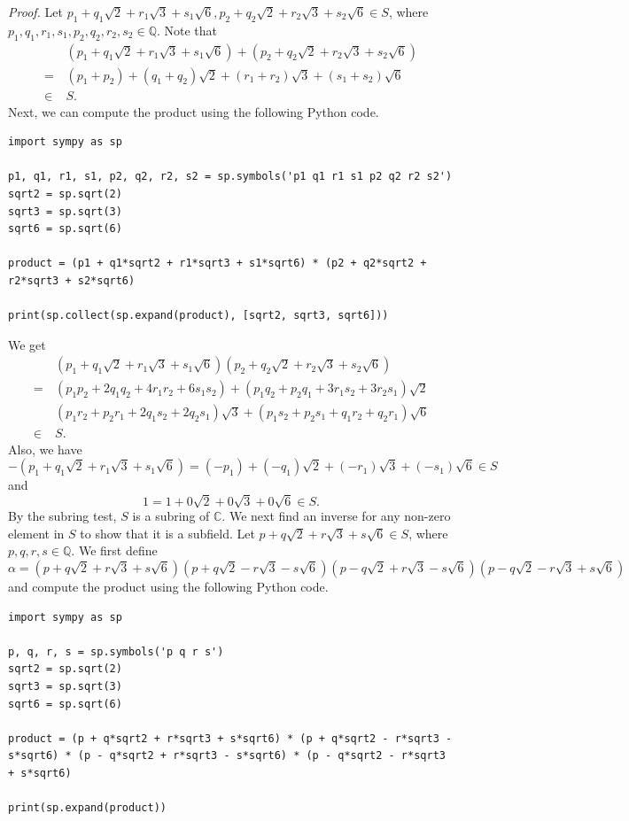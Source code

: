 \documentclass[a4paper, 12pt]{article}
\newcommand{\C}{\mathbb{C}}
\newcommand{\Q}{\mathbb{Q}}
\newcommand{\pf}{\noindent\textit{Proof. }}
\begin{document}
\pf Let $p_1+q_1\sqrt{2}+r_1\sqrt{3}+s_1\sqrt{6},p_2+q_2\sqrt{2}+r_2\sqrt{3}+s_2\sqrt{6} \in S$, where $p_1,q_1,r_1,s_1,p_2,q_2,r_2,s_2 \in \Q$. Note that
\begin{align*}
    & \, (p_1+q_1\sqrt{2}+r_1\sqrt{3}+s_1\sqrt{6}) + (p_2+q_2\sqrt{2}+r_2\sqrt{3}+s_2\sqrt{6}) \\
    =& \, (p_1+p_2)+(q_1+q_2)\sqrt{2}+(r_1+r_2)\sqrt{3}+(s_1+s_2)\sqrt{6} \\
    \in& \, S.
\end{align*}
Next, we can compute the product using the following Python code.
\begin{verbatim}
import sympy as sp

p1, q1, r1, s1, p2, q2, r2, s2 = sp.symbols('p1 q1 r1 s1 p2 q2 r2 s2')
sqrt2 = sp.sqrt(2)
sqrt3 = sp.sqrt(3)
sqrt6 = sp.sqrt(6)

product = (p1 + q1*sqrt2 + r1*sqrt3 + s1*sqrt6) * (p2 + q2*sqrt2 + r2*sqrt3 + s2*sqrt6)

print(sp.collect(sp.expand(product), [sqrt2, sqrt3, sqrt6]))
\end{verbatim}
We get
\begin{align*}
    & \, (p_1+q_1\sqrt{2}+r_1\sqrt{3}+s_1\sqrt{6})(p_2+q_2\sqrt{2}+r_2\sqrt{3}+s_2\sqrt{6}) \\
    =& \, (p_1p_2+2q_1q_2+4r_1r_2+6s_1s_2) + (p_1q_2+p_2q_1+3r_1s_2+3r_2s_1)\sqrt{2} \\
    & \, (p_1r_2+p_2r_1+2q_1s_2+2q_2s_1)\sqrt{3} + (p_1s_2+p_2s_1+q_1r_2+q_2r_1)\sqrt{6} \\
    \in& \, S.
\end{align*}
Also, we have \[ -(p_1+q_1\sqrt{2}+r_1\sqrt{3}+s_1\sqrt{6}) = (-p_1)+(-q_1)\sqrt{2}+(-r_1)\sqrt{3}+(-s_1)\sqrt{6} \in S \] and \[ 1 = 1+0\sqrt{2}+0\sqrt{3}+0\sqrt{6} \in S. \] By the subring test, $S$ is a subring of $\C$. We next find an inverse for any non-zero element in $S$ to show that it is a subfield. Let $p+q\sqrt{2}+r\sqrt{3}+s\sqrt{6} \in S$, where $p,q,r,s \in \Q$. We first define \[ \alpha = (p+q\sqrt{2}+r\sqrt{3}+s\sqrt{6})(p+q\sqrt{2}-r\sqrt{3}-s\sqrt{6})(p-q\sqrt{2}+r\sqrt{3}-s\sqrt{6})(p-q\sqrt{2}-r\sqrt{3}+s\sqrt{6}) \] and compute the product using the following Python code.
\begin{verbatim}
import sympy as sp

p, q, r, s = sp.symbols('p q r s')
sqrt2 = sp.sqrt(2)
sqrt3 = sp.sqrt(3)
sqrt6 = sp.sqrt(6)

product = (p + q*sqrt2 + r*sqrt3 + s*sqrt6) * (p + q*sqrt2 - r*sqrt3 - s*sqrt6) * (p - q*sqrt2 + r*sqrt3 - s*sqrt6) * (p - q*sqrt2 - r*sqrt3 + s*sqrt6)

print(sp.expand(product))
\end{verbatim}
\end{document}
